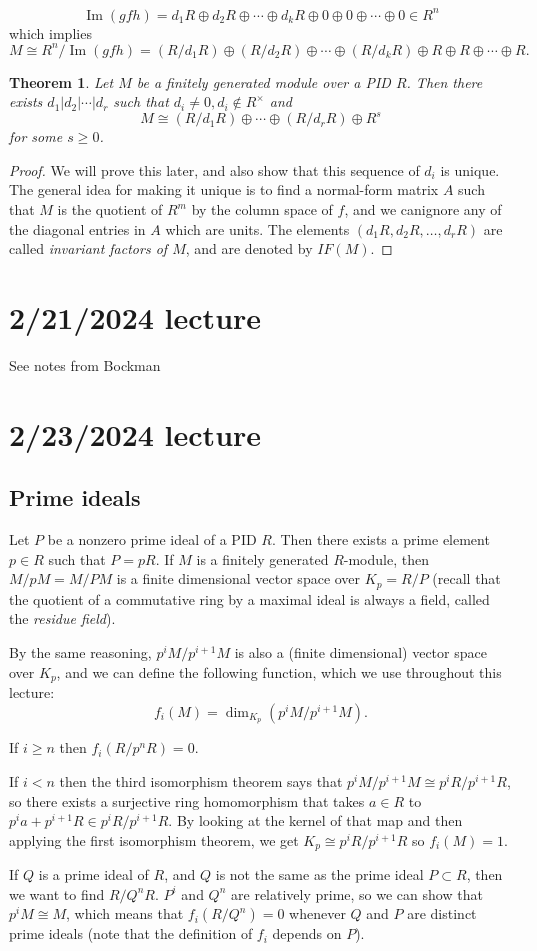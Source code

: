 \documentclass[12pt]{article}
\newtheorem{thm}{Theorem}[section]
\begin{document}
\[ \operatorname{Im}(gfh) = d_1 R \oplus d_2 R \oplus \cdots \oplus d_k R \oplus 0 \oplus 0 \oplus \cdots \oplus 0 \in R^n \]
which implies
\[ M \cong R^n/\operatorname{Im}(gfh) = (R/d_1 R) \oplus (R/d_2 R) \oplus \cdots \oplus (R/d_k R) \oplus R \oplus R \oplus \cdots \oplus R. \]
\par
\begin{thm}\label{moduleoverapid}
    Let $M$ be a finitely generated module over a PID $R$. Then there exists $d_1|d_2|\cdots|d_r$ such that $d_i \neq 0, d_i \not\in R^\times$ and
    \[ M \cong (R/d_1R) \oplus \cdots \oplus (R/d_rR) \oplus R^s \]
    for some $s \geq 0$.
\end{thm}
\begin{proof}
    We will prove this later, and also show that this sequence of $d_i$ is unique. The general idea for making it unique is to find a normal-form matrix $A$ such that $M$ is the quotient of $R^m$ by the column space of $f$, and we canignore any of the diagonal entries in $A$ which are units. The elements $(d_1R, d_2R, \dots, d_rR)$ are called \textit{invariant factors of $M$}, and are denoted by $IF(M)$.
\end{proof}

\section{2/21/2024 lecture}
See notes from Bockman

\section{2/23/2024 lecture}
\subsection{Prime ideals}
Let $P$ be a nonzero prime ideal of a PID $R$. Then there exists a prime element $p \in R$ such that $P=pR$. If $M$ is a finitely generated $R$-module, then $M/pM=M/PM$ is a finite dimensional vector space over $K_p=R/P$ (recall that the quotient of a commutative ring by a maximal ideal is always a field, called the \textit{residue field}).
\par
By the same reasoning, $p^iM/p^{i+1}M$ is also a (finite dimensional) vector space over $K_p$, and we can define the following function, which we use throughout this lecture:
\[ f_i(M)= \operatorname{dim}_{K_p} \left( p^iM/p^{i+1}M \right). \]
\par
If $i \geq n$ then $f_i(R/p^nR)=0$.
\par
If $i<n$ then the third isomorphism theorem says that $p^iM/p^{i+1}M \cong p^iR/p^{i+1}R$, so there exists a surjective ring homomorphism that takes $a \in R$ to $p^ia+p^{i+1}R \in p^iR/p^{i+1}R$. By looking at the kernel of that map and then applying the first isomorphism theorem, we get $K_p \cong p^iR/p^{i+1}R$ so $f_i(M)=1$.
\par
If $Q$ is a prime ideal of $R$, and $Q$ is not the same as the prime ideal $P \subset R$, then we want to find $R/Q^nR$. $P^i$ and $Q^n$ are relatively prime, so we can show that $p^iM \cong M$, which means that $f_i(R/Q^n)=0$ whenever $Q$ and $P$ are distinct prime ideals (note that the definition of $f_i$ depends on $P$).
\end{document}
